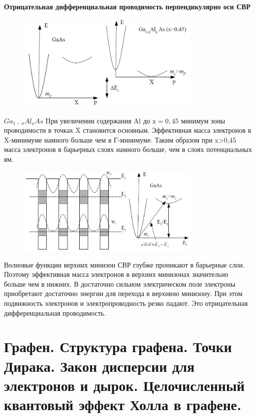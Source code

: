\textbf{Отрицательная дифференциальная проводимость перпендикулярно оси СВР}
\begin{figure}[h!]
\centering
 \includegraphics[width=0.8\textwidth]{images/ph30.11.jpg}
\end{figure}
$Ga_{1-x}Al_xAs$
При увеличении содержания Al до $\mathrm{x}=0,45$ минимум зоны проводимости в точках X становится основным. Эффективная масса электронов в X-минимуме намного больше чем в Г-минимуме. Таким образом при x>0,45 масса электронов в барьерных слоях намного больше, чем в слоях потенциальных ям.



\begin{figure}[h!]
\centering
 \includegraphics[width=0.8\textwidth]{images/ph30.12.jpg}
\end{figure}
Волновые функции верхних минизон СВР глубже проникают в барьерные слои.
Поэтому эффективная масса электронов в верхних минизонах значительно
больше чем в нижних. В достаточно сильном электрическом поле электроны
приобретают достаточно энергии для перехода в верхнюю минизону. При этом
подвижность электронов и электропроводность резко падают. Это отрицательная
дифференциальная проводимость. 


\section{Графен. Структура графена. Точки Дирака. Закон дисперсии для электронов и дырок.  Целочисленный квантовый эффект Холла в графене.}

